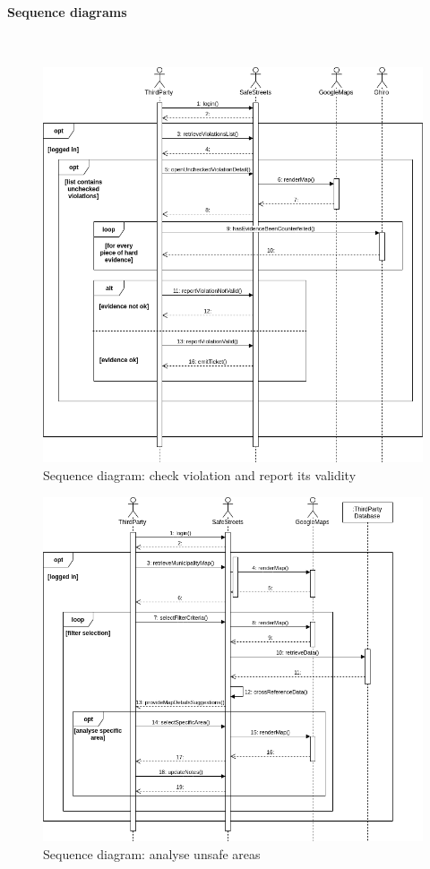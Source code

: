 \documentclass{article}
\begin{document}
\paragraph{Sequence diagrams}\mbox{}\\
\begin{figure}[H]
    \centering
    \includegraphics[scale=0.47]{Images/SequenceThirdPartyCheckViolation} 
    \caption{Sequence diagram: check violation and report its validity}
\end{figure}

\begin{figure}[H]
    \centering
    \includegraphics[scale=0.47]{Images/SequenceThirdPartyUnsafeAreas} 
    \caption{Sequence diagram: analyse unsafe areas}
\end{figure}
\end{document}
